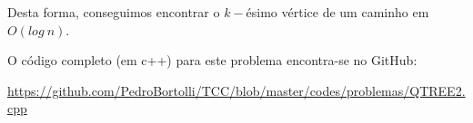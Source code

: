 Desta forma, conseguimos encontrar o $k-$ésimo vértice de um caminho em $O(log\ n)$.

\vspace{0.5cm}

O código completo (em c++) para este problema encontra-se no GitHub:

\url{https://github.com/PedroBortolli/TCC/blob/master/codes/problemas/QTREE2.cpp}

\vspace{0.3cm}
